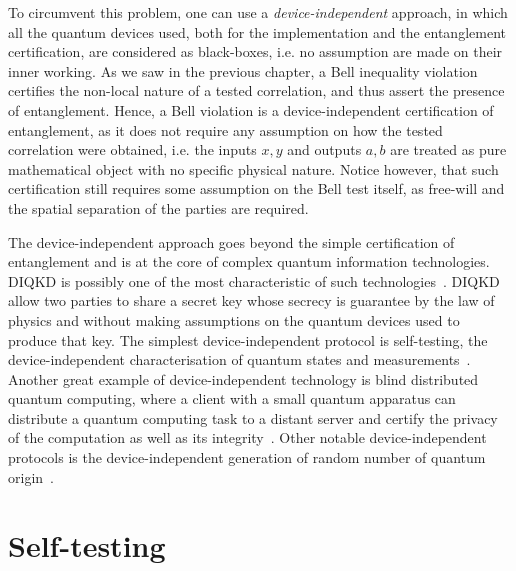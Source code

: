 To circumvent this problem, one can use a \textit{device-independent} approach, in which all the quantum devices used, both for the implementation and the entanglement certification, are considered as black-boxes, i.e. no assumption are made on their inner working.
As we saw in the previous chapter, a Bell inequality violation certifies the non-local nature of a tested correlation, and thus assert the presence of entanglement.
Hence, a Bell violation is a device-independent certification of entanglement, as it does not require any assumption on how the tested correlation were obtained, i.e. the inputs $x,y$ and outputs $a,b$ are treated as pure mathematical object with no specific physical nature.
Notice however, that such certification still requires some assumption on the Bell test itself, as free-will and the spatial separation of the parties are required.

\medbreak

The device-independent approach goes beyond the simple certification of entanglement and is at the core of complex quantum information technologies.
\acrfull{DIQKD} is possibly one of the most characteristic of such technologies~\cite{Pironio2009,Nadlinger2022}.
\acrshort{DIQKD} allow two parties to share a secret key whose secrecy is guarantee by the law of physics and without making assumptions on the quantum devices used to produce that key.
The simplest device-independent protocol is self-testing, the device-independent characterisation of quantum states and measurements~\cite{Supic2019}.
Another great example of device-independent technology is blind distributed quantum computing, where a client with a small quantum apparatus can distribute a quantum computing task to a distant server and certify the privacy of the computation as well as its integrity~\cite{Fitzsimons2017}.
Other notable device-independent protocols is the device-independent generation of random number of quantum origin~\cite{Liu2018}.

\section{Self-testing}

